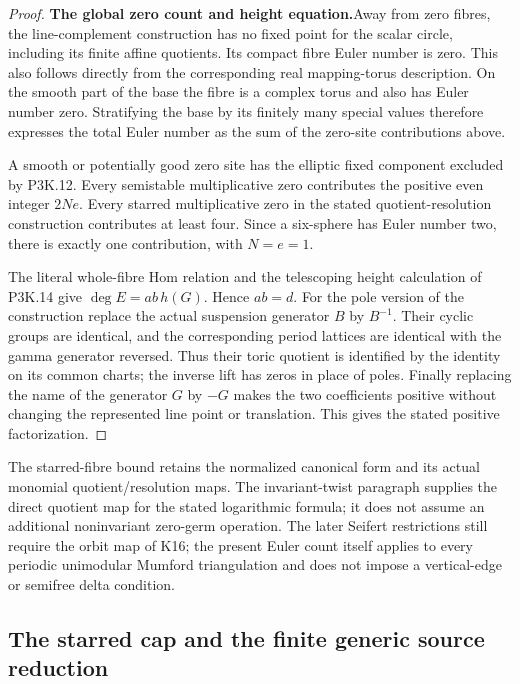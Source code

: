 \begin{proof}
\par\medskip\noindent\textbf{The global zero count and height equation.}\enspace Away from
zero fibres, the line-complement construction has no fixed
point for the scalar circle, including its finite affine
quotients.  Its compact fibre Euler number is zero.
This also follows directly from the corresponding real
mapping-torus description.  On the smooth part of the
base the fibre is a complex torus and also has Euler
number zero.  Stratifying the base by its finitely many
special values therefore expresses the total Euler number
as the sum of the zero-site contributions above.

A smooth or potentially good zero site has the elliptic
fixed component excluded by P3K.12.  Every semistable
multiplicative zero contributes the positive even integer
\(2Ne\).  Every starred multiplicative zero in the
stated quotient-resolution construction contributes at
least four.  Since a six-sphere has Euler number two,
there is exactly one contribution, with \(N=e=1\).

The literal whole-fibre Hom relation and the telescoping
height calculation of P3K.14 give
\(\deg E=ab\,h(G)\).  Hence \(ab=d\).
For the pole version of the construction replace the
actual suspension generator \(B\) by \(B^{-1}\).
Their cyclic groups are identical, and the corresponding
period lattices are identical with the gamma generator
reversed.  Thus their toric quotient is identified by the
identity on its common charts; the inverse lift has zeros
in place of poles.  Finally replacing the name of the
generator \(G\) by \(-G\) makes the two coefficients
positive without changing the represented line point or
translation.  This gives the stated positive factorization.
\end{proof}

The starred-fibre bound retains the normalized canonical form
and its actual monomial quotient/resolution maps.  The
invariant-twist paragraph supplies the direct quotient map
for the stated logarithmic formula; it does not assume an
additional noninvariant zero-germ operation.  The later
Seifert restrictions still require the orbit map of K16;
the present Euler count itself applies to every periodic
unimodular Mumford triangulation and does not impose a
vertical-edge or semifree delta condition.

\subsection{The starred cap and the finite generic source reduction}

